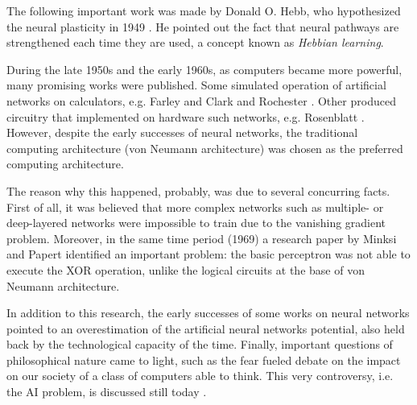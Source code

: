 The following important work was made by Donald O. Hebb, who hypothesized the neural plasticity in 1949 \cite{hebb1949organization}.
He pointed out the fact that neural pathways are strengthened each time they are used, a concept known as \textit{Hebbian learning}.

During the late 1950s and the early 1960s, as computers became more powerful, many promising works were published.
Some simulated operation of artificial networks on calculators, e.g. Farley and Clark \cite{Farley1954} and Rochester \cite{Rochester1956}.
Other produced circuitry that implemented on hardware such networks, e.g. Rosenblatt \cite{frank1957perceptron,Rosenblatt1958}.
However, despite the early successes of neural networks, the traditional computing architecture (von Neumann architecture) was chosen as the preferred computing architecture.

The reason why this happened, probably, was due to several concurring facts.
First of all, it was believed that more complex networks such as multiple- or deep-layered networks were impossible to train due to the vanishing gradient problem.
Moreover, in the same time period (1969) a research paper by Minksi and Papert \cite{minski1969perceptrons} identified an important problem: the basic perceptron was not able to execute the \ac{XOR} operation, unlike the logical circuits at the base of von Neumann architecture.


In addition to this research, the early successes of some works on neural networks pointed to an overestimation of the artificial neural networks potential, also held back by the technological capacity of the time.
Finally, important questions of philosophical nature came to light, such as the fear fueled debate on the impact on our society of a class of computers able to think.
This very controversy, i.e. the \ac{AI} problem, is discussed still today \cite{stanford.edu}.

